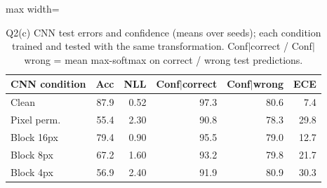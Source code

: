 \begin{table}[t]
\centering
\footnotesize
\setlength{\tabcolsep}{3.5pt}
\begin{adjustbox}{max width=\linewidth}
\begin{tabular}{lrrrrr}
\toprule
CNN condition & Acc & NLL & Conf$|$correct & Conf$|$wrong & ECE \\
\midrule
Clean & 87.9 & 0.52 & 97.3 & 80.6 & 7.4 \\
Pixel perm. & 55.4 & 2.30 & 90.8 & 78.3 & 29.8 \\
Block 16px & 79.4 & 0.90 & 95.5 & 79.0 & 12.7 \\
Block 8px & 67.2 & 1.60 & 93.2 & 79.8 & 21.7 \\
Block 4px & 56.9 & 2.40 & 91.9 & 80.9 & 30.3 \\
\bottomrule
\end{tabular}
\end{adjustbox}
\caption{Q2(c) CNN test errors and confidence (means over seeds); each condition trained and tested with the same transformation. Conf$|$correct / Conf$|$wrong = mean max-softmax on correct / wrong test predictions.}
\label{tab:q2conf}
\end{table}
